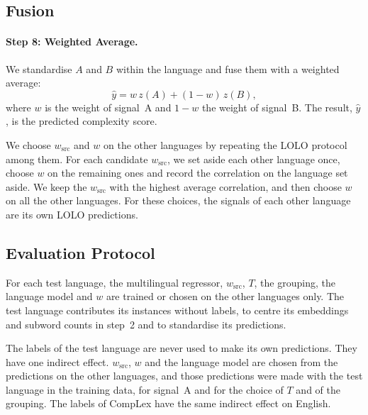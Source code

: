\subsection{Fusion}
\label{sec:fusion}

\paragraph{Step 8: Weighted Average.} We standardise $A$ and $B$ within the language and fuse them
with a weighted average:
\begin{equation}
\hat{y} = w\, z(A) + (1 - w)\, z(B),
\label{eq:fusion}
\end{equation}
where $w$ is the weight of signal~A and $1 - w$ the weight of signal~B. The result, $\hat{y}$, is the predicted %
complexity score.

We choose $w_{\mathrm{src}}$ and $w$ on the other languages by repeating the LOLO protocol among %
them. For each candidate $w_{\mathrm{src}}$, we set aside each other language once, choose $w$ on
the remaining ones and record the correlation on the language set aside. We keep the
$w_{\mathrm{src}}$ with the highest average correlation, and then choose $w$ on all the other
languages. For these choices, the signals of each other language are its own LOLO predictions. %

\subsection{Evaluation Protocol}
\label{sec:protocol}

For each test language, the multilingual regressor, $w_{\mathrm{src}}$, $T$, the grouping, the
language model and $w$ are trained or chosen on the other languages only. The test language
contributes its instances without labels, to centre its embeddings and subword counts in step~2 and %
to standardise its predictions. %

The labels of the test language are never used to make its own predictions. They have one indirect
effect. $w_{\mathrm{src}}$, $w$ and the language model are chosen from the predictions on the other %
languages, and those predictions were made with the test language in the training data, for
signal~A and for the choice of $T$ and of the grouping. The labels of CompLex have the same indirect
effect on English.

